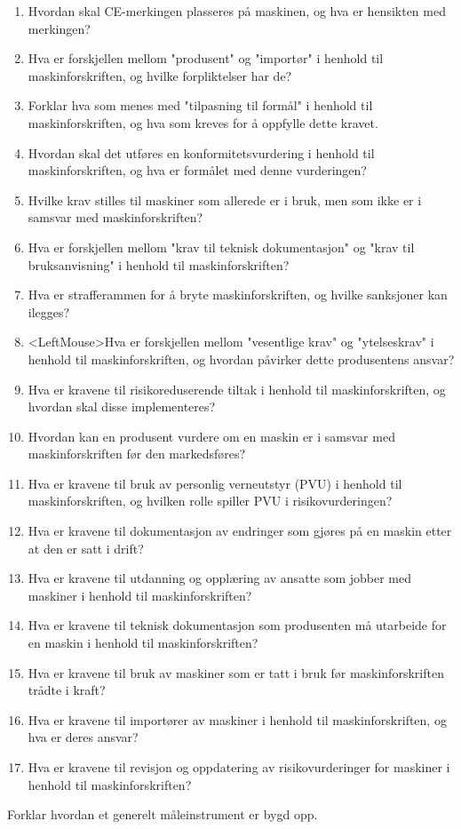 \documentclass[12pt,a4paper]{article}
\begin{document}
\begin{enumerate}
\item Hvordan skal CE-merkingen plasseres på maskinen, og hva er hensikten med merkingen?
\item Hva er forskjellen mellom "produsent" og "importør" i henhold til maskinforskriften, og hvilke forpliktelser har de?
\item Forklar hva som menes med "tilpasning til formål" i henhold til maskinforskriften, og hva som kreves for å oppfylle dette kravet.
\item Hvordan skal det utføres en konformitetsvurdering i henhold til maskinforskriften, og hva er formålet med denne vurderingen?
\item Hvilke krav stilles til maskiner som allerede er i bruk, men som ikke er i samsvar med maskinforskriften?
\item Hva er forskjellen mellom "krav til teknisk dokumentasjon" og "krav til bruksanvisning" i henhold til maskinforskriften?
\item Hva er strafferammen for å bryte maskinforskriften, og hvilke sanksjoner kan ilegges?
\item <LeftMouse>Hva er forskjellen mellom "vesentlige krav" og "ytelseskrav" i henhold til maskinforskriften, og hvordan påvirker dette produsentens ansvar?
\item Hva er kravene til risikoreduserende tiltak i henhold til maskinforskriften, og hvordan skal disse implementeres?
\item Hvordan kan en produsent vurdere om en maskin er i samsvar med maskinforskriften før den markedsføres?
\item Hva er kravene til bruk av personlig verneutstyr (PVU) i henhold til maskinforskriften, og hvilken rolle spiller PVU i risikovurderingen?
\item Hva er kravene til dokumentasjon av endringer som gjøres på en maskin etter at den er satt i drift?
\item Hva er kravene til utdanning og opplæring av ansatte som jobber med maskiner i henhold til maskinforskriften?
\item Hva er kravene til teknisk dokumentasjon som produsenten må utarbeide for en maskin i henhold til maskinforskriften?
\item Hva er kravene til bruk av maskiner som er tatt i bruk før maskinforskriften trådte i kraft?
\item Hva er kravene til importører av maskiner i henhold til maskinforskriften, og hva er deres ansvar?
\item Hva er kravene til revisjon og oppdatering av risikovurderinger for maskiner i henhold til maskinforskriften?
\end{enumerate}
Forklar hvordan et generelt måleinstrument er bygd opp.
\end{document}

